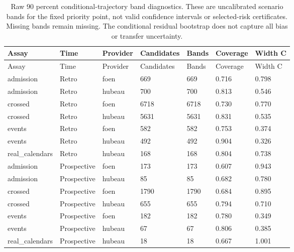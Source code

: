 {\tabletext
\setlength{\tabcolsep}{3pt}
\begin{longtable}{p{}p{}p{}p{}p{}p{}p{}}
\caption{Raw 90 percent conditional-trajectory band diagnostics. These are uncalibrated scenario bands for the fixed priority point, not valid confidence intervals or selected-risk certificates. Missing bands remain missing. The conditional residual bootstrap does not capture all bias or transfer uncertainty.}\label{tab:r3si-scenario_bands}\\
\toprule
Assay & Time & Provider & Candidates & Bands & Coverage & Width C \\
\midrule
\endfirsthead
\toprule
Assay & Time & Provider & Candidates & Bands & Coverage & Width C \\
\midrule
\endhead
admission & Retro & foen & 669 & 669 & 0.716 & 0.798 \\
admission & Retro & hubeau & 700 & 700 & 0.813 & 0.546 \\
crossed & Retro & foen & 6718 & 6718 & 0.730 & 0.770 \\
crossed & Retro & hubeau & 5631 & 5631 & 0.831 & 0.535 \\
events & Retro & foen & 582 & 582 & 0.753 & 0.374 \\
events & Retro & hubeau & 492 & 492 & 0.904 & 0.326 \\
real\_\allowbreak calendars & Retro & hubeau & 168 & 168 & 0.804 & 0.738 \\
admission & Prospective & foen & 173 & 173 & 0.607 & 0.943 \\
admission & Prospective & hubeau & 85 & 85 & 0.682 & 0.780 \\
crossed & Prospective & foen & 1790 & 1790 & 0.684 & 0.895 \\
crossed & Prospective & hubeau & 655 & 655 & 0.794 & 0.710 \\
events & Prospective & foen & 182 & 182 & 0.780 & 0.349 \\
events & Prospective & hubeau & 67 & 67 & 0.806 & 0.385 \\
real\_\allowbreak calendars & Prospective & hubeau & 18 & 18 & 0.667 & 1.001 \\
\bottomrule
\end{longtable}
}

